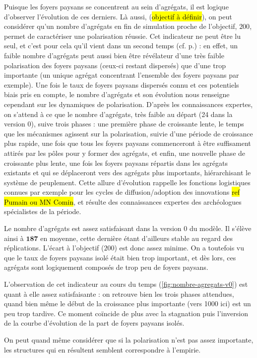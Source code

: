 \documentclass[12pt, a4paper, oneside]{book}
\begin{document}
	Puisque les foyers paysans se concentrent au sein d'agrégats, il est logique d'observer l'évolution de ces derniers. Là aussi, (\hl{objectif à définir}), on peut considérer qu'un nombre d'agrégats en fin de simulation proche de l'objectif, $200$, permet de caractériser une polarisation réussie. Cet indicateur ne peut être lu seul, et c'est pour cela qu'il vient dans un second temps (cf. p.\pageref{par:hierarchie_interne}) : en effet, un faible nombre d'agrégats peut aussi bien être révélateur d'une très faible polarisation des foyers paysans (ceux-ci restant dispersés) que d'une trop importante (un unique agrégat concentrant l'ensemble des foyers paysans par exemple).
	Une fois le taux de foyers paysans dispersés connu et ces potentiels biais pris en compte, le nombre d'agrégats et son évolution nous renseigne cependant sur les dynamiques de polarisation. 
	D'après les connaissances expertes, on s'attend à ce que le nombre d'agrégats, très faible au départ (24 dans la version 0), suive trois phases : une première phase de croissante lente, le temps que les mécanismes agissent sur la polarisation, suivie d'une période de croissance plus rapide, une fois que tous les foyers paysans commenceront à être suffisament attirés par les pôles pour y former des agrégats, et enfin, une nouvelle phase de croissante plus lente, une fois les foyers paysans répartis dans les agrégats existants et qui se déplaceront vers des agrégats plus importants, hiérarchisant le système de peuplement. Cette allure d'évolution rappelle les fonctions logistiques connues par exemple pour les cycles de diffusion/adoption des innovations \hl{ref Pumain ou MN Comin}, et résulte des connaissances expertes des archéologues spécialistes de la période.
	
	\begin{mdframed}[backgroundcolor=gray!10,footnoteinside=false]
		Le nombre d'agrégats est assez satisfaisant dans la version 0 du modèle. Il s'élève ainsi à $\textbf{187}$ en moyenne, cette dernière étant d'ailleurs stable au regard des réplications. L'écart à l'objectif ($200$) est donc assez minime. On a toutefois vu que le taux de foyers paysans isolé était bien trop important, et dès lors, ces agrégats sont logiquement composés de trop peu de foyers paysans.
		
		L'observation de cet indicateur au cours du temps (\cref{fig:nombre-agregats-v0}) est quant à elle assez satisfaisante : on retrouve bien les trois phases attendues, quand bien même le début de la croissance plus importante (vers 1000 ici) est un peu trop tardive. Ce moment coïncide de plus avec la stagnation puis l'inversion de la courbe d'évolution de la part de foyers paysans isolés.
		
		On peut quand même considérer que si la polarisation n'est pas assez importante, les structures qui en résultent semblent correspondre à l'empirie.
	\end{mdframed}
\end{document}
